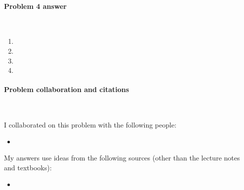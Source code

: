 

\paragraph{Problem 4 answer}~

\begin{blue}

\begin{enumerate}[label=(\alph*)]


\item %
  
  \REPLACEME 


\item %

  \REPLACEME 


\item %

  \REPLACEME 


\item %
  
  \REPLACEME 

\end{enumerate}

\end{blue}


\vfill

\paragraph{Problem  collaboration and citations}~

I collaborated on this problem with the following people:
\begin{blue}
  \begin{itemize}
  \item \REPLACEME                    %
  \end{itemize}
\end{blue}

My answers use ideas from the following sources (other than the lecture notes and textbooks): 
\begin{blue}
  \begin{itemize}
  \item \REPLACEME                    %
  \end{itemize}
\end{blue}



